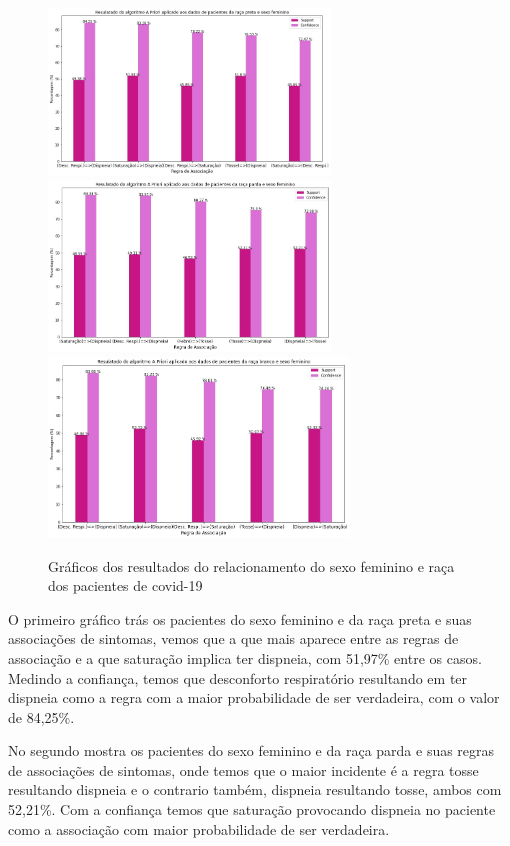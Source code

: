 \documentclass[tcc1]{uftex}
\begin{document}
    \begin{figure}[!h]
    \centering
    \includegraphics[width=7.5cm]{1_Preta_feminino_apriori.jpg}
    \includegraphics[width=7.5cm]{1_Parda_feminina_apriori.jpg}
    \includegraphics[width=8cm]{1_Branca_feminino_apriori.jpg}
    \caption{Gráficos dos resultados do relacionamento do sexo feminino e raça dos pacientes de covid-19}
    \end{figure}
    
    O primeiro gráfico trás os pacientes do sexo feminino e da raça preta e suas associações de sintomas, vemos que a que mais aparece entre as regras de associação e a que saturação implica ter dispneia, com 51,97\% entre os casos. Medindo a confiança, temos que desconforto respiratório resultando em ter dispneia como a regra com a maior probabilidade de ser verdadeira, com o valor de 84,25\%.
    
    No segundo mostra os pacientes do sexo feminino e da raça parda e suas regras de associações de sintomas, onde temos que o maior incidente é a regra tosse resultando dispneia e o contrario também, dispneia resultando tosse, ambos com 52,21\%. Com a confiança temos que saturação provocando dispneia no paciente como a associação com maior probabilidade de ser verdadeira.
    
\end{document}
